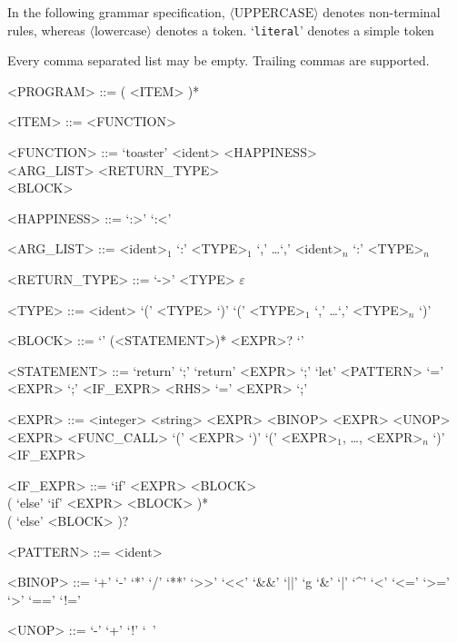 \documentclass[10pt]{artikel1}
\newcommand{\eempty}{$\varepsilon$}
\begin{document}
In the following grammar specification, $\langle \text{UPPERCASE} \rangle$
denotes non-terminal rules, whereas $\langle \text{lowercase} \rangle$ denotes a token. `\verb|literal|' denotes a simple token

Every comma separated list may be empty. Trailing commas are supported.

\begin{grammar}


    <PROGRAM> ::= ( <ITEM> )*

    <ITEM> ::= <FUNCTION>

    <FUNCTION> ::= `toaster' <ident> <HAPPINESS> \\
    <ARG_LIST> <RETURN_TYPE> \\
    <BLOCK>

    <HAPPINESS> ::= `:>' \alt `:<'


    <ARG_LIST> ::= <ident>$_1$ `:' <TYPE>$_1$ `,' \dots `,' <ident>$_n$ `:' <TYPE>$_n$

    <RETURN_TYPE> ::= `->' <TYPE>
    \alt \eempty

    <TYPE> ::= <ident>
    \alt `(' <TYPE> `)'
    \alt `(' <TYPE>$_1$ `,' \dots `,' <TYPE>$_n$ `)'


    <BLOCK> ::= `{' (<STATEMENT>)* <EXPR>? `}'

    <STATEMENT> ::= `return' `;'
    \alt `return' <EXPR> `;'
    \alt `let' <PATTERN> `=' <EXPR> `;'
    \alt <IF_EXPR>
    \alt <RHS> `=' <EXPR> `;'

    <EXPR> ::= <integer>
    \alt <string>
    \alt <EXPR> <BINOP> <EXPR>
    \alt <UNOP> <EXPR>
    \alt <FUNC_CALL>
    \alt `(' <EXPR> `)'
    \alt `(' <EXPR>$_1$, \dots, <EXPR>$_n$ `)'
    \alt <IF_EXPR>

    <IF_EXPR> ::= `if' <EXPR> <BLOCK> \\ ( `else' `if' <EXPR> <BLOCK> )* \\( `else' <BLOCK> )?

    <PATTERN> ::= <ident>

    <BINOP> ::= `+'
    \alt `-'
    \alt `*'
    \alt `/'
    \alt `**'
    \alt `>>'
    \alt `<<'
    \alt `&&'
    \alt `||'
    \alt `^^'
    \alt `&'
    \alt `|'
    \alt `^'
    \alt `<'
    \alt `<='
    \alt `>='
    \alt `>'
    \alt `=='
    \alt `!='

    <UNOP> ::= `-'
    \alt `+'
    \alt `!'
    \alt `~'

\end{grammar}
\end{document}
